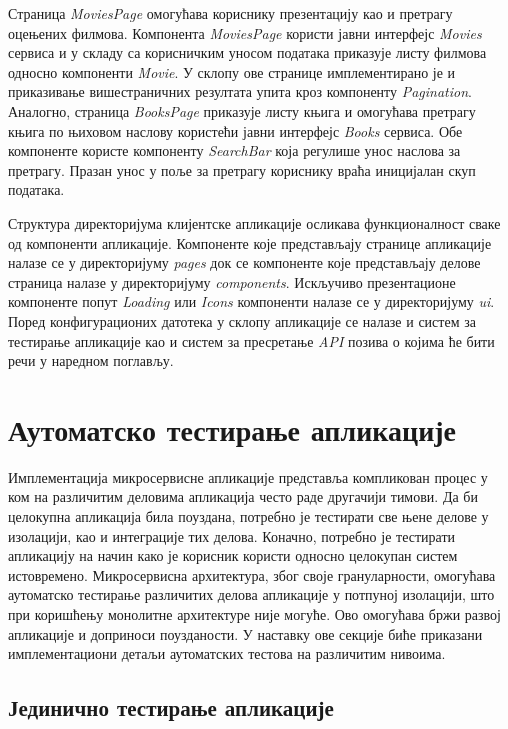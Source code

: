 \documentclass[12pt,oneside]{memoir}
\begin{document}
Страница \textit{MoviesPage} омогућава кориснику презентацију као и претрагу оцењених филмова. Компонента  \textit{MoviesPage} користи јавни интерфејс \textit{Movies} сервиса и у складу са корисничким уносом података приказује листу филмова односно компоненти \textit{Movie}.  У склопу ове странице имплементирано је и приказивање вишестраничних резултата упита кроз компоненту \textit{Pagination}. Аналогно, страница \textit{BooksPage} приказује листу књига и омогућава претрагу књига по њиховом наслову користећи јавни интерфејс \textit{Books} сервиса. Обе компоненте користе компоненту \textit{SearchBar} која регулише унос наслова за претрагу. Празан унос у поље за претрагу кориснику враћа иницијалан скуп података.

Структура директоријума клијентске апликације осликава функционалност сваке од компоненти апликације. Компоненте које представљају странице апликације налазе се у директоријуму \textit{pages} док се компоненте које представљају делове страница налазе у директоријуму \textit{components}. Искључиво презентационе компоненте попут \textit{Loading} или \textit{Icons} компоненти налазе се у директоријуму \textit{ui}. Поред конфигурационих датотека у склопу апликације се налазе и систем за тестирање апликације као и систем за пресретање \textit{API} позива о којима ће бити речи у наредном поглављу.



\section{Аутоматско тестирање апликације}

Имплементација микросервисне апликације представља компликован процес у ком на различитим деловима апликација често раде другачији тимови. Да би целокупна апликација била поуздана, потребно је тестирати све њене делове у изолацији, као и интеграције тих делова. Коначно, потребно је тестирати апликацију на начин како је корисник користи односно целокупан систем истовремено.
Микросервисна архитектура, због своје грануларности, омогућава аутоматско тестирање различитих делова апликације у потпуној изолацији, што при коришћењу монолитне архитектуре није могуће. Ово омогућава бржи развој апликације и доприноси поузданости.
У наставку ове секције биће приказани имплементациони детаљи аутоматских тестова на различитим нивоима.

\subsection{Јединично тестирање апликације}
\end{document}
